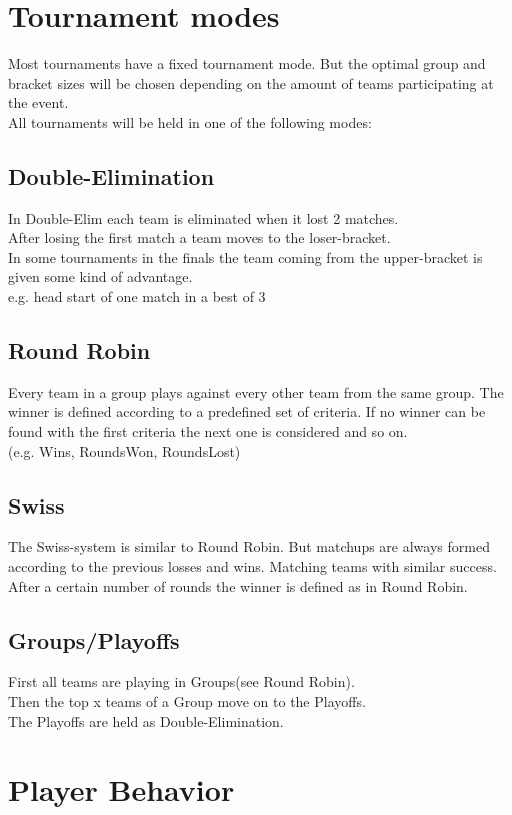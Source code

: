 \documentclass{article}
\begin{document}
\section{Tournament modes}
Most tournaments have a fixed tournament mode.
But the optimal group and bracket sizes will be chosen depending on the amount of teams participating at the event.\\
All tournaments will be held in one of the following modes:

\subsection{Double-Elimination}
In Double-Elim each team is eliminated when it lost 2 matches.\\
After losing the first match a team moves to the loser-bracket.\\
In some tournaments in the finals the team coming from the upper-bracket is given some kind of advantage.\\
e.g. head start of one match in a best of 3

\subsection{Round Robin}
Every team in a group plays against every other team from the same group.
The winner is defined according to a predefined set of criteria.
If no winner can be found with the first criteria the next one is considered and so on.\\
(e.g. Wins, RoundsWon, RoundsLost)

\subsection{Swiss}
The Swiss-system is similar to Round Robin. But matchups are always formed according to the previous losses and wins. Matching teams with similar success. After a certain number of rounds the winner is defined as in Round Robin.


\subsection{Groups/Playoffs}
First all teams are playing in Groups(see %
Round Robin).\\
Then the top x teams of a Group move on to the Playoffs.\\
The Playoffs are held as Double-Elimination.


\section{Player Behavior}
\end{document}
